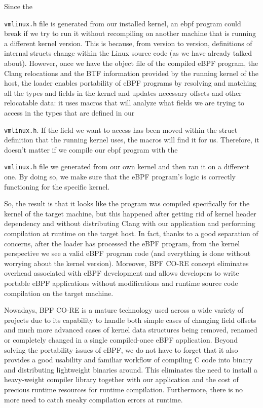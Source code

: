 Since the \raggedright\colorbox{backcolour}{\lstinline[style=commandline, language=bash]|vmlinux.h|} file is generated from our installed kernel, an ebpf program could break if we try to run it without recompiling on another machine that is running a different kernel version. 
This is because, from version to version, definitions of internal structs change within the Linux source code (as we have already talked about).
However, once we have the object file of the compiled eBPF program, the Clang relocations and the BTF information provided by the running kernel of the host, the loader enables portability of eBPF programs by resolving and matching all the types and fields in the kernel and updates necessary offsets and other relocatable data: it uses macros that will analyze what fields we are trying to access in the types that are defined in our \raggedright\colorbox{backcolour}{\lstinline[style=commandline, language=bash]|vmlinux.h|}. 
If the field we want to access has been moved within the struct definition that the running kernel uses, the macros will find it for us. 
Therefore, it doesn't matter if we compile our ebpf program with the \raggedright\colorbox{backcolour}{\lstinline[style=commandline, language=bash]|vmlinux.h|} file we generated from our own kernel and then ran it on a different one.
By doing so, we make sure that the eBPF program’s logic is correctly functioning for the specific kernel.

So, the result is that it looks like the program was compiled specifically for the kernel of the target machine, but this happened after getting rid of kernel header dependency and without distributing Clang with our application and performing compilation at runtime on the target host.
In fact, thanks to a good separation of concerns, after the loader has processed the eBPF program, from the kernel perspective we see a valid eBPF program code (and everything is done without worrying about the kernel version).
Moreover, BPF CO-RE concept eliminates overhead associated with eBPF development and allows developers to write portable eBPF applications without modifications and runtime source code compilation on the target machine.

Nowadays, BPF CO-RE is a mature technology used across a wide variety of projects due to its capability to handle both simple cases of changing field offsets and much more advanced cases of kernel data structures being removed, renamed or completely changed in a single compiled-once eBPF application.
Beyond solving the portability issues of eBPF, we do not have to forget that it also provides a good usability and familiar workflow of compiling C code into binary and distributing lightweight binaries around. 
This eliminates the need to install a heavy-weight compiler library together with our application and the cost of precious runtime resources for runtime compilation. 
Furthermore, there is no more need to catch sneaky compilation errors at runtime.

